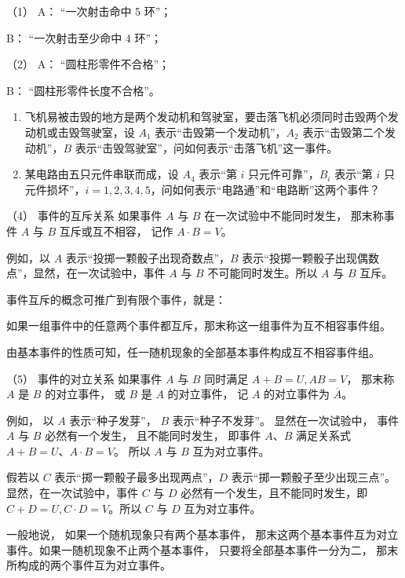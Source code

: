 （1） A： ``一次射击命中 5 环''；

B： ``一次射击至少命中 4 环''；

（2） A： ``圆柱形零件不合格''；

B： ``圆柱形零件长度不合格''。

\begin{enumerate}[start=5]
\item
  飞机易被击毁的地方是两个发动机和驾驶室，要击落飞机必须同时击毁两个发动机或击毁驾驶室，设
  \(A_{1}\) 表示``击毁第一个发动机''，\(A_{2}\)
  表示``击毁第二个发动机''，\(B\)
  表示``击毁驾驶室''，问如何表示``击落飞机''这一事件。
\item
  某电路由五只元件串联而成，设 \(A_{4}\) 表示``第 \(i\)
  只元件可靠''，\(B_{i}\) 表示``第 \(i\)
  只元件损坏''，\(i = 1, 2, 3, 4, 5\)，问如何表示``电路通''和``电路断''这两个事件？
\end{enumerate}

（4） 事件的互斥关系 如果事件 \(A\) 与 \(B\) 在一次试验中不能同时发生，
那末称事件 \(A\) 与 \(B\) 互斥或互不相容， 记作 \(A \cdot B = V\)。

例如，以 \(A\) 表示``投掷一颗骰子出现奇数点''，\(B\)
表示``投掷一颗骰子出现偶数点''，显然，在一次试验中，事件 \(A\) 与 \(B\)
不可能同时发生。所以 \(A\) 与 \(B\) 互斥。

事件互斥的概念可推广到有限个事件，就是：

如果一组事件中的任意两个事件都互斥，那末称这一组事件为互不相容事件组。

由基本事件的性质可知，任一随机现象的全部基本事件构成互不相容事件组。

（5） 事件的对立关系 如果事件 \(A\) 与 \(B\) 同时满足
\(A + B = U, AB = V\)， 那末称 \(A\) 是 \(B\) 的对立事件， 或 \(B\) 是
\(A\) 的对立事件， 记 \(A\) 的对立事件为 \(\overline{A}\)。

例如， 以 \(A\) 表示``种子发芽''， \(B\) 表示``种子不发芽''。
显然在一次试验中， 事件 \(A\) 与 \(B\) 必然有一个发生， 且不能同时发生，
即事件 \(A\)、\(B\) 满足关系式 \(A + B = U\)、\(A \cdot B = V\)。 所以
\(A\) 与 \(B\) 互为对立事件。

假若以 \(C\) 表示``掷一颗骰子最多出现两点''，\(D\)
表示``掷一颗骰子至少出现三点''。显然，在一次试验中，事件 \(C\) 与 \(D\)
必然有一个发生，且不能同时发生，即 \(C + D = U, C \cdot D = V\)。所以
\(C\) 与 \(D\) 互为对立事件。

一般地说， 如果一个随机现象只有两个基本事件，
那末这两个基本事件互为对立事件。如果一随机现象不止两个基本事件，
只要将全部基本事件一分为二， 那末所构成的两个事件互为对立事件。

